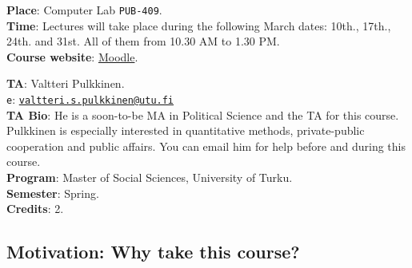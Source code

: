 \documentclass[letterpaper]{article}
\begin{document}
\vspace{5mm}
{\bf Place}: Computer Lab \texttt{PUB-409}.\\
{\bf Time}: Lectures will take place during the following March dates: 10th., 17th., 24th. and 31st. All of them from 10.30 AM to 1.30 PM.\\

{\bf Course website}: \href{https://moodle.utu.fi/course/view.php?id=24005}{Moodle}.

\vspace{5mm}
{\bf TA}: Valtteri Pulkkinen.\\
\texttt{e}: \href{mailto:valtteri.s.pulkkinen@utu.fi}{\texttt{valtteri.s.pulkkinen@utu.fi}}\\
{\bf TA Bio}: He is a soon-to-be MA in Political Science and the TA for this course. Pulkkinen is especially interested in quantitative methods, private-public cooperation and public affairs. You can email him for help before and during this course.\\



\vspace{5mm}
{\bf Program}:  Master of Social Sciences, University of Turku.\\
{\bf Semester}: Spring.\\
{\bf Credits}: 2.





\subsection*{Motivation: Why take this course?}
\end{document}
